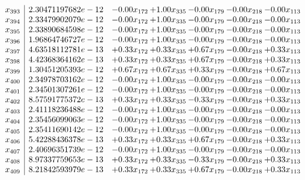 \documentclass[8pt]{article}
\begin{document}
\[\begin{array}{c| c c@{\hskip 2pt} c@{\hskip 2pt} c@{\hskip 2pt} c@{\hskip 2pt} c@{\hskip 2pt} }
 x_{393}   &  2.30471197682e-12 & -0.00 x_{172} & +  1.00 x_{335} & -0.00 x_{179} & -0.00 x_{218} & -0.00 x_{113}\\
 x_{394}   &  2.33479902079e-12 & -0.00 x_{172} & +  1.00 x_{335} & -0.00 x_{179} & -0.00 x_{218} & -0.00 x_{113}\\
 x_{395}   &  2.33890684598e-12 & -0.00 x_{172} & +  1.00 x_{335} & -0.00 x_{179} & -0.00 x_{218} & -0.00 x_{113}\\
 x_{396}   &  1.96864746727e-12 & -0.00 x_{172} & +  1.00 x_{335} & -0.00 x_{179} & -0.00 x_{218} & -0.00 x_{113}\\
 x_{397}   &  4.63518112781e-13 & +  0.33 x_{172} & +  0.33 x_{335} & +  0.67 x_{179} & -0.00 x_{218} & +  0.33 x_{113}\\
 x_{398}   &  4.42368364162e-13 & +  0.33 x_{172} & +  0.33 x_{335} & +  0.67 x_{179} & -0.00 x_{218} & +  0.33 x_{113}\\
 x_{399}   &  1.30451205393e-12 & +  0.67 x_{172} & +  0.67 x_{335} & +  0.33 x_{179} & -0.00 x_{218} & +  0.67 x_{113}\\
 x_{400}   &  2.34978703162e-12 & -0.00 x_{172} & +  1.00 x_{335} & -0.00 x_{179} & -0.00 x_{218} & -0.00 x_{113}\\
 x_{401}   &  2.34501307261e-12 & -0.00 x_{172} & +  1.00 x_{335} & -0.00 x_{179} & -0.00 x_{218} & -0.00 x_{113}\\
 x_{402}   &  8.57591775372e-13 & +  0.33 x_{172} & +  0.33 x_{335} & -0.33 x_{179} & -0.00 x_{218} & +  0.33 x_{113}\\
 x_{403}   &  2.41118236488e-12 & -0.00 x_{172} & +  1.00 x_{335} & -0.00 x_{179} & -0.00 x_{218} & -0.00 x_{113}\\
 x_{404}   &  2.35456099063e-12 & -0.00 x_{172} & +  1.00 x_{335} & -0.00 x_{179} & -0.00 x_{218} & -0.00 x_{113}\\
 x_{405}   &  2.35411690142e-12 & -0.00 x_{172} & +  1.00 x_{335} & -0.00 x_{179} & -0.00 x_{218} & -0.00 x_{113}\\
 x_{406}   &  5.42288436378e-13 & +  0.33 x_{172} & +  0.33 x_{335} & +  0.67 x_{179} & -0.00 x_{218} & +  0.33 x_{113}\\
 x_{407}   &  2.40696351739e-12 & -0.00 x_{172} & +  1.00 x_{335} & -0.00 x_{179} & -0.00 x_{218} & -0.00 x_{113}\\
 x_{408}   &  8.97337759653e-13 & +  0.33 x_{172} & +  0.33 x_{335} & -0.33 x_{179} & -0.00 x_{218} & +  0.33 x_{113}\\
 x_{409}   &  8.21842593979e-13 & +  0.33 x_{172} & +  0.33 x_{335} & +  0.67 x_{179} & -0.00 x_{218} & +  0.33 x_{113}\\

\end{array}\]
\end{document}
